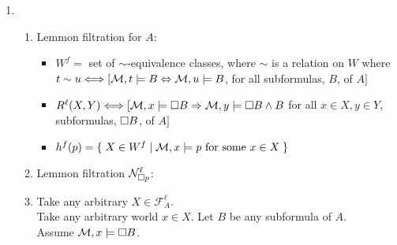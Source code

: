 \documentclass[a4paper, draft, 12pt]{article}
\begin{document}
\begin{enumerate}
\begin{enumerate}
\begin{enumerate}
  Now take any time $t'$ in the future of $t$. If $t' < f$ then there is indeed a future time 
  where $q$ is true ($f$). So $t'$ must satisfy $Fq$. If $t' \geqslant f'$, $q$ is always true 
  in the future of $f'$, and so must always be true in the future of $t'$.
  So there must be a time when $q$ is true in the future $t'$. Hence $t'$ must satisfy $Fq$. \\
  Any future time of $t$, $t'$, satisfies $Fq$, so we have $GFq$.\\
  Hence $FGq \imp GFq$ is satisfied at all worlds $t$ of $\M$.

  \item %
  Not valid. We can find some model $\M_0$ constructed from $(\mathbb{N}, <)$ where 
  at some world, $t$, $GFq$ holds but $FGq$ doesn't. Let $\M_0$ have assignment
  $h(q) = \{\;t\in \mathbb{N} \;|\; t \text{ is even }\}$.\\
  $GFq$ is satisfied at $t$, as for all future times of $t$, $t'$, 
  there will be some future time of $t'$ where $q$ is true 
  (say, at the next even time larger than $t'$). 
  However $FGq$ isn't satisfied at $t$. We cannot find a 
  future time of $t$, $f$, where for all times in future of $f$, $q$ is true. 
  There will be some odd time in the future of $f$ where $q$ is false. 
  \end{enumerate}
\end{enumerate}
\item %
  \begin{enumerate}
  \item %
  Lemmon filtration for $A$: 
  \begin{itemize}
  \item $W^{f} = $ set of $\sim$-equivalence classes, where $\sim$ is a relation on $W$
  where $t \sim u \Longleftrightarrow [\mathcal{M}, t \models B \Leftrightarrow \mathcal{M}, u \models B$, for all subformulas, $B$, of $A]$
  \item $R^{\ell}(X,Y) \Longleftrightarrow [\mathcal{M},x \models \square B \Rightarrow \mathcal{M}, y \models \square B \wedge B$ for all $x \in X, y \in Y$,  subformulas, $\square B$, of $A]$
  \item $h^f(p) = \{\; X \in W^{f} \;|\; \mathcal{M}, x \models p \text{ for some } x \in X \;\}$
  \end{itemize}
  \item %
  Lemmon filtration $\mathcal{N}^{\ell}_{\square p}$: \\
  \item %
  Take any arbitrary $X \in \mathcal{F}^{\ell}_{A}$. \\
  Take any arbitrary world $x \in X$. Let $B$ be any subformula of $A$.\\
  Assume $\mathcal{M}, x \models \square B$.


\end{enumerate}
\end{enumerate}
\end{document}
